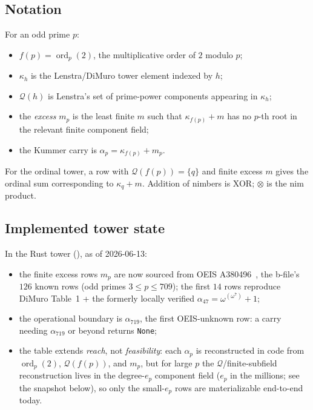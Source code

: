 \documentclass[11pt]{article}
\theoremstyle{plain}
\theoremstyle{definition}
\newcommand{\ord}{\operatorname{ord}}
\newcommand{\nimmul}{\otimes}
\newcommand{\Qset}{\mathcal{Q}}
\begin{document}
\subsection{Notation}

For an odd prime $p$:
\begin{itemize}[leftmargin=*,itemsep=0pt]
\item $f(p)=\ord_p(2)$, the multiplicative order of $2$ modulo $p$;
\item $\kappa_h$ is the Lenstra/DiMuro tower element indexed by $h$;
\item $\Qset(h)$ is Lenstra's set of prime-power components appearing in
$\kappa_h$;
\item the \emph{excess} $m_p$ is the least finite $m$ such that
$\kappa_{f(p)}+m$ has no $p$-th root in the relevant finite component
field;
\item the Kummer carry is $\alpha_p=\kappa_{f(p)}+m_p$.
\end{itemize}
For the ordinal tower, a row with $\Qset(f(p))=\{q\}$ and finite excess
$m$ gives the ordinal sum corresponding to $\kappa_q+m$. Addition of
nimbers is XOR; $\nimmul$ is the nim product.

\subsection{Implemented tower state}

In the Rust tower (), as of 2026-06-13:
\begin{itemize}[leftmargin=*,itemsep=0pt]
\item the finite excess rows $m_p$ are now sourced from OEIS
A380496~\cite{OEIS}, the b-file's $126$ known rows (odd primes
$3 \le p \le 709$); the first $14$ rows reproduce DiMuro Table~1 + the
formerly locally verified $\alpha_{47}=\omega^{(\omega^7)}+1$;
\item the operational boundary is $\alpha_{719}$, the first OEIS-unknown
row: a carry needing $\alpha_{719}$ or beyond returns \texttt{None};
\item the table extends \emph{reach}, not \emph{feasibility}: each
$\alpha_p$ is reconstructed in code from $\ord_p(2)$, $\Qset(f(p))$, and
$m_p$, but for large $p$ the $\Qset$/finite-subfield reconstruction lives
in the degree-$e_p$ component field ($e_p$ in the millions; see the
snapshot below), so only the small-$e_p$ rows are materializable
end-to-end today.
\end{itemize}
\end{document}
